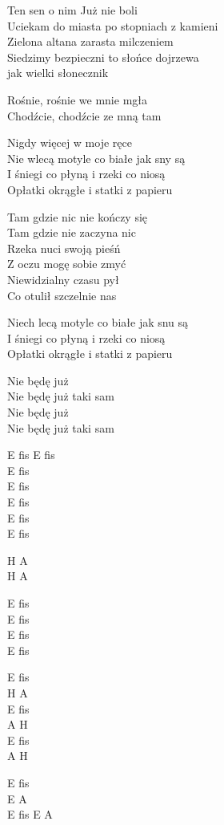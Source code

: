 \begin{text}
    Ten sen o nim Już nie boli\\
    Uciekam do miasta po stopniach z kamieni\\
    Zielona altana zarasta milczeniem\\
    Siedzimy bezpieczni to słońce dojrzewa\\
    jak wielki słonecznik

    Rośnie, rośnie we mnie mgła\\
    Chodźcie, chodźcie ze mną tam

    Nigdy więcej w moje ręce\\
    Nie wlecą motyle co białe jak sny są\\
    I śniegi co płyną i rzeki co niosą\\
    Opłatki okrągłe i statki z papieru

    Tam gdzie nic nie kończy się\\
    Tam gdzie nie zaczyna nic\\
    Rzeka nuci swoją pieśń\\
    Z oczu mogę sobie zmyć\\
    Niewidzialny czasu pył\\
    Co otulił szczelnie nas

    Niech lecą motyle co białe jak snu są\\
    I śniegi co płyną i rzeki co niosą\\
    Opłatki okrągłe i statki z papieru

    Nie będę już\\
    Nie będę już taki sam\\
    Nie będę już\\
    Nie będę już taki sam
\end{text}
\begin{chord}
    E fis E fis\\
    E fis\\
    E fis\\
    E fis\\
    E fis\\
    E fis

    H A\\
    H A

    E fis\\
    E fis\\
    E fis\\
    E fis

    E fis\\
    H A\\
    E fis\\
    A H\\
    E fis\\
    A H

    E fis\\
    E A\\
    E fis E A
\end{chord}